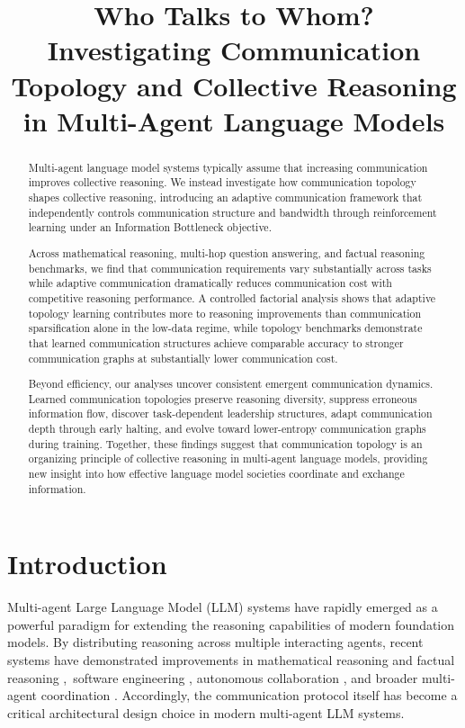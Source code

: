 \documentclass[11pt]{article}
\title{Who Talks to Whom?\\
       Investigating Communication Topology and Collective Reasoning in Multi-Agent Language Models}
\begin{document}
\maketitle

\begin{abstract}

Multi-agent language model systems typically assume that increasing communication improves collective reasoning. We instead investigate how communication topology shapes collective reasoning, introducing an adaptive communication framework that independently controls communication structure and bandwidth through reinforcement learning under an Information Bottleneck objective.

Across mathematical reasoning, multi-hop question answering, and factual reasoning benchmarks, we find that communication requirements vary substantially across tasks while adaptive communication dramatically reduces communication cost with competitive reasoning performance. A controlled factorial analysis shows that adaptive topology learning contributes more to reasoning improvements than communication sparsification alone in the low-data regime, while topology benchmarks demonstrate that learned communication structures achieve comparable accuracy to stronger communication graphs at substantially lower communication cost.

Beyond efficiency, our analyses uncover consistent emergent communication dynamics. Learned communication topologies preserve reasoning diversity, suppress erroneous information flow, discover task-dependent leadership structures, adapt communication depth through early halting, and evolve toward lower-entropy communication graphs during training. Together, these findings suggest that communication topology is an organizing principle of collective reasoning in multi-agent language models, providing new insight into how effective language model societies coordinate and exchange information.

\end{abstract}



\section{Introduction}
\label{sec:intro}

Multi-agent Large Language Model (LLM) systems have rapidly emerged as a powerful paradigm for extending the reasoning capabilities of modern foundation models. By distributing reasoning across multiple interacting agents, recent systems have demonstrated improvements in mathematical reasoning and factual reasoning
\citep{du2024improving,liang-etal-2024-encouraging},\
software engineering
\citep{hong2024metagpt,qian-etal-2024-chatdev},
autonomous collaboration
\citep{wu2024autogen,li2023camel},
and broader multi-agent coordination
\citep{zhuge2024gptswarm}. Accordingly, the communication protocol itself has become a critical architectural design choice in modern multi-agent LLM systems.
\end{document}

